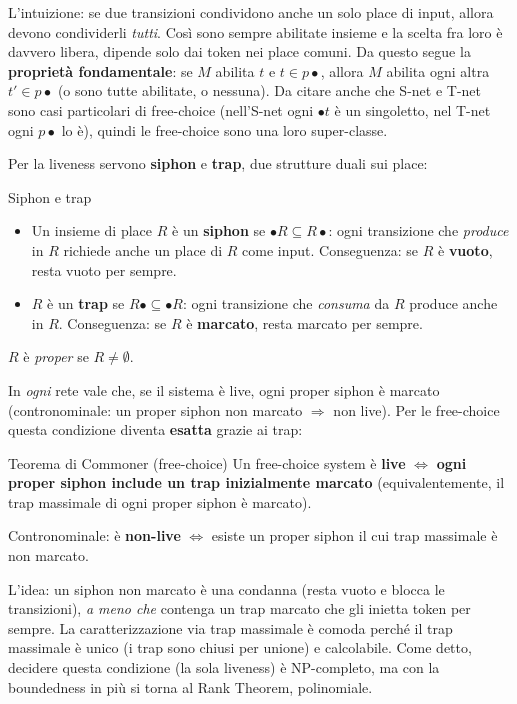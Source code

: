 L'intuizione: se due transizioni condividono anche un solo place di input, allora devono condividerli \emph{tutti}. Così sono sempre abilitate insieme e la scelta fra loro è davvero libera, dipende solo dai token nei place comuni. Da questo segue la \textbf{proprietà fondamentale}: se $M$ abilita $t$ e $t \in p\bullet$, allora $M$ abilita ogni altra $t' \in p\bullet$ (o sono tutte abilitate, o nessuna). Da citare anche che S-net e T-net sono casi particolari di free-choice (nell'S-net ogni $\bullet t$ è un singoletto, nel T-net ogni $p\bullet$ lo è), quindi le free-choice sono una loro super-classe.

Per la liveness servono \textbf{siphon} e \textbf{trap}, due strutture duali sui place:

\begin{definizione}{Siphon e trap}
\begin{itemize}
  \item Un insieme di place $R$ è un \textbf{siphon} se $\bullet R \subseteq R\bullet$: ogni transizione che \emph{produce} in $R$ richiede anche un place di $R$ come input. Conseguenza: se $R$ è \textbf{vuoto}, resta vuoto per sempre.
  \item $R$ è un \textbf{trap} se $R\bullet \subseteq \bullet R$: ogni transizione che \emph{consuma} da $R$ produce anche in $R$. Conseguenza: se $R$ è \textbf{marcato}, resta marcato per sempre.
\end{itemize}
$R$ è \emph{proper} se $R \ne \emptyset$.
\end{definizione}

In \emph{ogni} rete vale che, se il sistema è live, ogni proper siphon è marcato (contronominale: un proper siphon non marcato $\Rightarrow$ non live). Per le free-choice questa condizione diventa \textbf{esatta} grazie ai trap:

\begin{teorema}{Teorema di Commoner (free-choice)}
Un free-choice system è \textbf{live} $\iff$ \textbf{ogni proper siphon include un trap inizialmente marcato} (equivalentemente, il trap massimale di ogni proper siphon è marcato).

Contronominale: è \textbf{non-live} $\iff$ esiste un proper siphon il cui trap massimale è non marcato.
\end{teorema}

L'idea: un siphon non marcato è una condanna (resta vuoto e blocca le transizioni), \emph{a meno che} contenga un trap marcato che gli inietta token per sempre. La caratterizzazione via trap massimale è comoda perché il trap massimale è unico (i trap sono chiusi per unione) e calcolabile. Come detto, decidere questa condizione (la sola liveness) è NP-completo, ma con la boundedness in più si torna al Rank Theorem, polinomiale.

